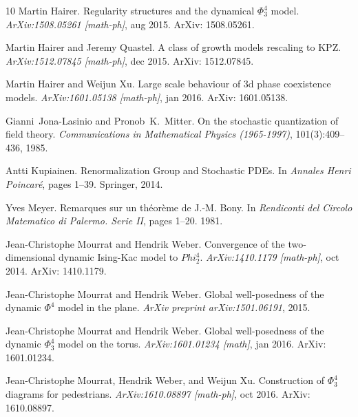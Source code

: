 \documentclass[a4paper,11pt]{article}
\newcommand{\tmtextit}[1]{{\itshape{#1}}}
\begin{document}
\begin{thebibliography}{10}
  Martin Hairer. {\newblock}Regularity
  structures and the dynamical $\Phi^4_3$ model.
  {\newblock}\tmtextit{ArXiv:1508.05261 [math-ph]}, aug 2015.
  {\newblock}ArXiv: 1508.05261.{\newblock}
  
  Martin Hairer  and  Jeremy Quastel.
  {\newblock}A class of growth models rescaling to KPZ.
  {\newblock}\tmtextit{ArXiv:1512.07845 [math-ph]}, dec 2015.
  {\newblock}ArXiv: 1512.07845.{\newblock}
  
  Martin Hairer  and  Weijun Xu.
  {\newblock}Large scale behaviour of 3d phase coexistence models.
  {\newblock}\tmtextit{ArXiv:1601.05138 [math-ph]}, jan 2016.
  {\newblock}ArXiv: 1601.05138.{\newblock}
  
  Gianni~Jona-Lasinio  and 
  Pronob~K.~Mitter. {\newblock}On the stochastic quantization of field theory.
  {\newblock}\tmtextit{Communications in Mathematical Physics (1965-1997)},
  101(3):409--436, 1985.{\newblock}
  
  Antti Kupiainen.
  {\newblock}Renormalization Group and Stochastic PDEs. {\newblock}In
  \tmtextit{Annales Henri Poincar{\'e}},  pages  1--39. Springer,
  2014.{\newblock}
  
  Yves Meyer. {\newblock}Remarques sur un
  th{\'e}or{\`e}me de J.-M. Bony. {\newblock}In \tmtextit{Rendiconti del
  Circolo Matematico di Palermo. Serie II},  pages  1--20. 1981.{\newblock}
  
  Jean-Christophe Mourrat  and  Hendrik
  Weber. {\newblock}Convergence of the two-dimensional dynamic Ising-Kac model
  to $Phi^4_2$. {\newblock}\tmtextit{ArXiv:1410.1179 [math-ph]}, oct 2014.
  {\newblock}ArXiv: 1410.1179.{\newblock}
  
  Jean-Christophe Mourrat  and  Hendrik
  Weber. {\newblock}Global well-posedness of the dynamic $\Phi^4$ model in the
  plane. {\newblock}\tmtextit{ArXiv preprint arXiv:1501.06191},
  2015.{\newblock}
  
  Jean-Christophe Mourrat  and  Hendrik
  Weber. {\newblock}Global well-posedness of the dynamic $\Phi^4_3$ model on
  the torus. {\newblock}\tmtextit{ArXiv:1601.01234 [math]}, jan 2016.
  {\newblock}ArXiv: 1601.01234.{\newblock}
  
  Jean-Christophe Mourrat, Hendrik
  Weber, and  Weijun Xu. {\newblock}Construction of $\Phi^4_3$ diagrams for
  pedestrians. {\newblock}\tmtextit{ArXiv:1610.08897 [math-ph]}, oct 2016.
  {\newblock}ArXiv: 1610.08897.{\newblock}
  

\end{thebibliography}
\end{document}
